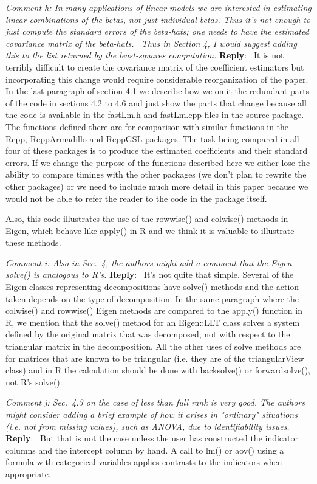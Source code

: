\documentclass[10pt]{article}
\newcommand{\pointRaised}[2]{\smallskip %
  \textsl{{\fontseries{b}\selectfont #1}: #2}\newline}
\newcommand{\reply}[1]{\textbf{Reply}:\ #1 \smallskip } %
\begin{document}
\pointRaised{Comment h}{ In many applications of linear models we are
  interested in estimating linear combinations of the betas, not just
  individual betas.  Thus it's not enough to just compute the standard
  errors of the beta-hats; one needs to have the estimated covariance
  matrix of the beta-hats.  Thus in Section 4, I would suggest adding
  this to the list returned by the least-squares computation.
}
\reply{ 
  It is not terribly difficult to create the covariance matrix of the
  coefficient estimators but incorporating this change would require
  considerable reorganization of the paper.  In the last paragraph of
  section 4.1 we describe how we omit the redundant parts of the code
  in sections 4.2 to 4.6 and just show the parts that change because
  all the code is available in the fastLm.h and fastLm.cpp files in
  the source package.  The functions defined there are for comparison
  with similar functions in the Rcpp, RcppArmadillo and RcppGSL
  packages.  The task being compared in all four of these packages is
  to produce the estimated coefficients and their standard errors.  If
  we change the purpose of the functions described here we either lose
  the ability to compare timings with the other packages (we don't
  plan to rewrite the other packages) or we need to include much more
  detail in this paper because we would not be able to refer the
  reader to the code in the package itself.

  Also, this code illustrates the use of the rowwise() and colwise()
  methods in Eigen, which behave like apply() in R and we think it is
  valuable to illustrate these methods.
}


\pointRaised{Comment i}{
  Also in Sec.~4, the authors might add a comment that the Eigen
  solve() is analogous to R's.
}
\reply{
  It's not quite that simple.  Several of the Eigen classes
  representing decompositions have solve() methods and the action taken
  depends on the type of decomposition.  In the same paragraph where
  the colwise() and rowwise() Eigen methods are compared to the
  apply() function in R, we mention that the solve() method for an
  Eigen::LLT class solves a system defined by the original matrix that
  was decomposed, not with respect to the triangular matrix in the
  decomposition.  All the other uses of solve methods are for matrices
  that are known to be triangular (i.e. they are of the triangularView
  class) and in R the calculation should be done with backsolve()
  or forwardsolve(), not R's solve().
}


\pointRaised{Comment j}{
  Sec.~4.3 on the case of less than full rank is very good. The
  authors might consider adding a brief example of how it arises in 
  "ordinary" situations (i.e. not from missing values), such as ANOVA, due
  to identifiability issues.
}
\reply{
  But that is not the case unless the user has constructed the
  indicator columns and the intercept column by hand.  A call to lm()
  or aov() using a formula with categorical variables applies
  contrasts to the indicators when appropriate.
}
\end{document}
